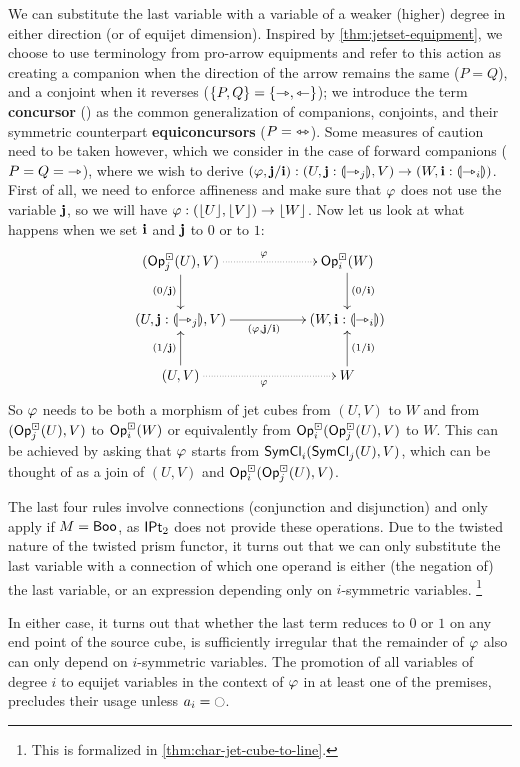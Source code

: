 \documentclass[a4paper]{memoir}
\begin{document}
We can substitute the last variable with a variable of a weaker (higher) degree in either direction (or of equijet dimension).
Inspired by \cref{thm:jetset-equipment}, we choose to use terminology from pro-arrow equipments and refer to this action as creating a companion when the direction of the arrow remains the same ($P = Q$), and a conjoint when it reverses ($\mathopen{}\left\{ P, Q \right\}\mathclose{} = \mathopen{}\left\{ \rightarrowtriangle, \leftarrowtriangle \right\}\mathclose{}$); we introduce the term \textbf{concursor} () as the common generalization of companions, conjoints, and their symmetric counterpart \textbf{equiconcursors} ($P = {\leftrightarrowtriangle}$).
Some measures of caution need to be taken however, which we consider in the case of forward companions ($P = Q = {\rightarrowtriangle}$), where we wish to derive $(\varphi, \mathbf{j} / \mathbf{i}) : (U, \mathbf{j} : {\llparenthesis \rightarrowtriangle_j \rrparenthesis}, V) \to (W, \mathbf{i} : {\llparenthesis \rightarrowtriangle_i \rrparenthesis})$.
First of all, we need to enforce affineness and make sure that $\varphi$ does not use the variable $\mathbf{j}$, so we will have $\varphi : (\mathopen{}\left\lfloor U \right\rfloor\mathclose{}, \mathopen{}\left\lfloor V \right\rfloor\mathclose{}) \to \mathopen{}\left\lfloor W \right\rfloor\mathclose{}$.
Now let us look at what happens when we set $\mathbf{i}$ and $\mathbf{j}$ to $0$ or to $1$:
\[
	\xymatrix{
		(\Opcube_j(U), V)
			\ar[d]_{(0/\dm j)}
			\ar@{.>}[rr]^\vfi
		&&
		\Opcube_i(W)
			\ar[d]^{(0/\dm i)}
		\\
		(U, \dm j : \rival{\jet_j}, V)
			\ar[rr]_{(\vfi, \dm j / \dm i)}
		&& (W, \dm i : \rival{\jet_i})
		\\
		(U, V)
			\ar[u]^{(1/\dm j)}
			\ar@{.>}[rr]_\vfi
		&&
		W
			\ar[u]_{(1/\dm i)}
	}
\]
So $\varphi$ needs to be both a morphism of jet cubes from $(U, V)$ to $W$ and from $({\mathsf{Op}}^\boxdot_j(U), V)$ to ${\mathsf{Op}}^\boxdot_i(W)$ or equivalently from ${\mathsf{Op}}^\boxdot_i({\mathsf{Op}}^\boxdot_j(U), V)$ to $W$. This can be achieved by asking that $\varphi$ starts from \allowbreak $\mathsf{SymCl}_i(\mathsf{SymCl}_j(U), V)$, which can be thought of as a join of $(U, V)$ and ${\mathsf{Op}}^\boxdot_i({\mathsf{Op}}^\boxdot_j(U), V)$.

The last four rules involve connections (conjunction and disjunction) and only apply if $M = \mathsf{Boo}$, as ${\mathsf{IPt}_2}$ does not provide these operations.
Due to the twisted nature of the twisted prism functor, it turns out that we can only substitute the last variable with a connection of which one operand is either
(the negation of) the last variable, or an expression depending only on $i$-symmetric variables.%
\footnote{This is formalized in \cref{thm:char-jet-cube-to-line}.}

In either case, it turns out that whether the last term reduces to $0$ or $1$ on any end point of the source cube, is sufficiently irregular that the remainder of $\varphi$ also can only depend on $i$-symmetric variables.
The promotion of all variables of degree $i$ to equijet variables in the context of $\varphi$ in at least one of the premises, precludes their usage unless $a_i = \npolar$.
\end{document}
